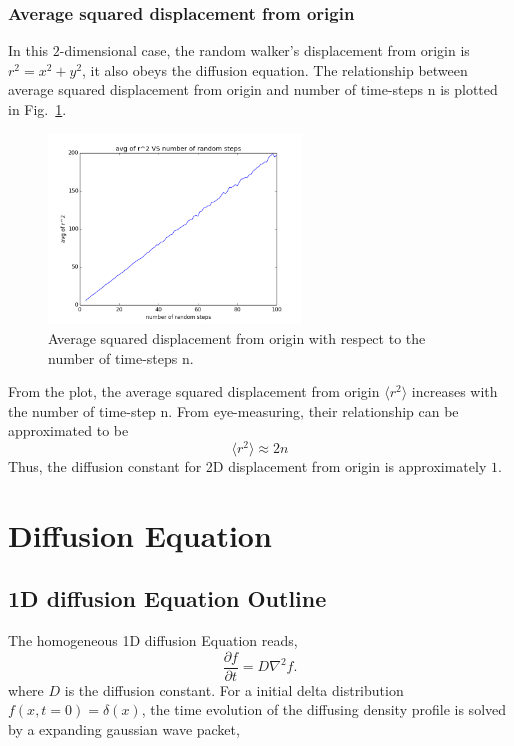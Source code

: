 \documentclass[a4paper,12pt]{article}
\begin{document}
\subsubsection{Average squared displacement from origin}
In this $2$-dimensional case, the random walker's displacement from origin is $r^2 = x^2 + y^2$, it also obeys the diffusion equation. The relationship between average squared displacement from origin and number of time-steps n is plotted in Fig.~\ref{Fig:r2avg}. \\
\begin{figure}[!htb]
 \centering
  \includegraphics[width=0.6\textwidth]{pics/r2avg.png}
 \caption{Average squared displacement from origin with respect to the number of time-steps n.}
  \label{Fig:r2avg}
\end{figure}
From the plot, the average squared displacement from origin $\langle r^2 \rangle$ increases with the number of time-step n. From eye-measuring, their relationship can be approximated to be $$\langle r^2 \rangle \approx 2n$$ Thus, the diffusion constant for 2D displacement from origin is approximately $1$.

\section{Diffusion Equation}
\subsection{1D diffusion Equation Outline}
\indent
\indent The homogeneous 1D diffusion Equation reads,
\begin{equation}
	\frac{\partial f}{\partial t} = D \nabla^2 f.
\end{equation}
where $D$ is the diffusion constant. For a initial delta distribution $f(x, t = 0) = \delta(x)$, the time evolution of the diffusing density profile is solved by a expanding gaussian wave packet,
\end{document}
